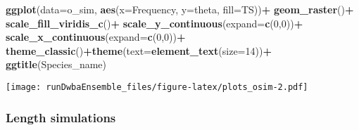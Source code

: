 \documentclass[
]{article}
\newenvironment{Shaded}{\begin{snugshade}}{\end{snugshade}}
\newcommand{\DataTypeTok}[1]{\textcolor[rgb]{0.13,0.29,0.53}{#1}}
\newcommand{\DecValTok}[1]{\textcolor[rgb]{0.00,0.00,0.81}{#1}}
\newcommand{\KeywordTok}[1]{\textcolor[rgb]{0.13,0.29,0.53}{\textbf{#1}}}
\newcommand{\NormalTok}[1]{#1}
\newcommand{\OperatorTok}[1]{\textcolor[rgb]{0.81,0.36,0.00}{\textbf{#1}}}
\newcommand{\StringTok}[1]{\textcolor[rgb]{0.31,0.60,0.02}{#1}}
\begin{document}
\begin{Shaded}
\begin{Highlighting}[]

\KeywordTok{ggplot}\NormalTok{(}\DataTypeTok{data=}\NormalTok{o_sim, }\KeywordTok{aes}\NormalTok{(}\DataTypeTok{x=}\NormalTok{Frequency, }\DataTypeTok{y=}\NormalTok{theta, }\DataTypeTok{fill=}\NormalTok{TS))}\OperatorTok{+}
\StringTok{  }\KeywordTok{geom_raster}\NormalTok{()}\OperatorTok{+}
\StringTok{  }\KeywordTok{scale_fill_viridis_c}\NormalTok{()}\OperatorTok{+}
\StringTok{  }\KeywordTok{scale_y_continuous}\NormalTok{(}\DataTypeTok{expand=}\KeywordTok{c}\NormalTok{(}\DecValTok{0}\NormalTok{,}\DecValTok{0}\NormalTok{))}\OperatorTok{+}
\StringTok{  }\KeywordTok{scale_x_continuous}\NormalTok{(}\DataTypeTok{expand=}\KeywordTok{c}\NormalTok{(}\DecValTok{0}\NormalTok{,}\DecValTok{0}\NormalTok{))}\OperatorTok{+}
\StringTok{  }\KeywordTok{theme_classic}\NormalTok{()}\OperatorTok{+}\KeywordTok{theme}\NormalTok{(}\DataTypeTok{text=}\KeywordTok{element_text}\NormalTok{(}\DataTypeTok{size=}\DecValTok{14}\NormalTok{))}\OperatorTok{+}
\StringTok{  }\KeywordTok{ggtitle}\NormalTok{(Species_name)}
\end{Highlighting}
\end{Shaded}

\texttt{[image: runDwbaEnsemble\_files/figure-latex/plots\_osim-2.pdf]}

\hypertarget{length-simulations}{%
\subsubsection{Length simulations}\label{length-simulations}}
\end{document}
